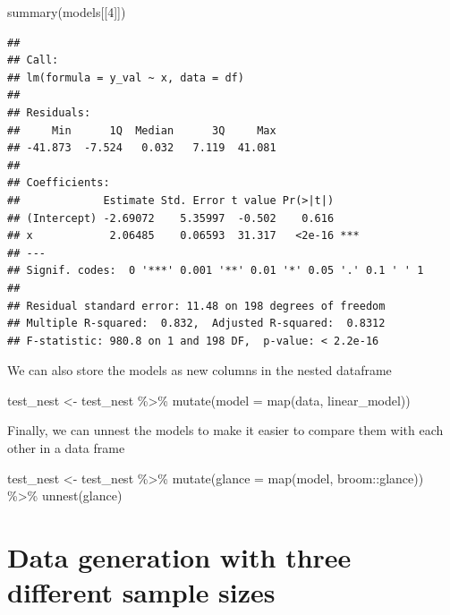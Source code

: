 \documentclass[
]{book}
\newenvironment{Shaded}{\begin{snugshade}}{\end{snugshade}}
\newcommand{\AttributeTok}[1]{\textcolor[rgb]{0.77,0.63,0.00}{#1}}
\newcommand{\DecValTok}[1]{\textcolor[rgb]{0.00,0.00,0.81}{#1}}
\newcommand{\FunctionTok}[1]{\textcolor[rgb]{0.00,0.00,0.00}{#1}}
\newcommand{\NormalTok}[1]{#1}
\newcommand{\OtherTok}[1]{\textcolor[rgb]{0.56,0.35,0.01}{#1}}
\newcommand{\SpecialCharTok}[1]{\textcolor[rgb]{0.00,0.00,0.00}{#1}}
\begin{document}
\begin{Shaded}
\begin{Highlighting}[]
\FunctionTok{summary}\NormalTok{(models[[}\DecValTok{4}\NormalTok{]])}
\end{Highlighting}
\end{Shaded}

\begin{verbatim}
## 
## Call:
## lm(formula = y_val ~ x, data = df)
## 
## Residuals:
##     Min      1Q  Median      3Q     Max 
## -41.873  -7.524   0.032   7.119  41.081 
## 
## Coefficients:
##             Estimate Std. Error t value Pr(>|t|)    
## (Intercept) -2.69072    5.35997  -0.502    0.616    
## x            2.06485    0.06593  31.317   <2e-16 ***
## ---
## Signif. codes:  0 '***' 0.001 '**' 0.01 '*' 0.05 '.' 0.1 ' ' 1
## 
## Residual standard error: 11.48 on 198 degrees of freedom
## Multiple R-squared:  0.832,  Adjusted R-squared:  0.8312 
## F-statistic: 980.8 on 1 and 198 DF,  p-value: < 2.2e-16
\end{verbatim}

We can also store the models as new columns in the nested dataframe

\begin{Shaded}
\begin{Highlighting}[]
\NormalTok{test\_nest }\OtherTok{\textless{}{-}}\NormalTok{ test\_nest }\SpecialCharTok{\%\textgreater{}\%} 
  \FunctionTok{mutate}\NormalTok{(}\AttributeTok{model =} \FunctionTok{map}\NormalTok{(data, linear\_model))}
\end{Highlighting}
\end{Shaded}

Finally, we can unnest the models to make it easier to compare them with each other in a data frame

\begin{Shaded}
\begin{Highlighting}[]
\NormalTok{test\_nest }\OtherTok{\textless{}{-}}\NormalTok{ test\_nest }\SpecialCharTok{\%\textgreater{}\%} 
  \FunctionTok{mutate}\NormalTok{(}\AttributeTok{glance =} \FunctionTok{map}\NormalTok{(model, broom}\SpecialCharTok{::}\NormalTok{glance)) }\SpecialCharTok{\%\textgreater{}\%} 
  \FunctionTok{unnest}\NormalTok{(glance)}
\end{Highlighting}
\end{Shaded}

\hypertarget{data-generation-with-three-different-sample-sizes}{%
\section{Data generation with three different sample sizes}\label{data-generation-with-three-different-sample-sizes}}
\end{document}
